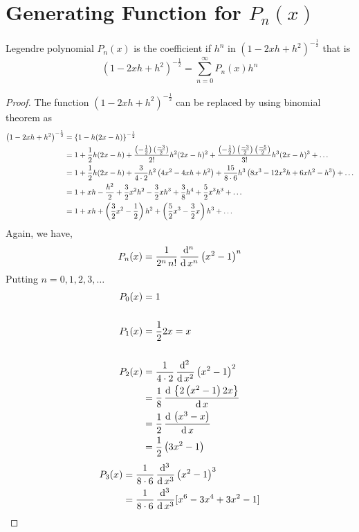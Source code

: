 \documentclass[../main-sheet.tex]{subfiles}
\begin{document}
\section{Generating Function for $ P_n(x) $}
Legendre polynomial $ P_n(x) $ is the coefficient if $ h^n $ in $ \left(1-2xh+h^2\right)^{-\frac{1}{2}} $ that is
\[
    \left(1-2xh+h^2\right)^{-\frac{1}{2}} =\sum_{n=0}^\infty P_n(x)h^n
\]
\begin{proof}
    The function $ \left(1-2xh+h^2\right)^{-\frac{1}{2}} $ can be replaced by using binomial theorem as 
    \begin{align}
        \left(1-2xh+h^2\right)^{-\frac{1}{2}} &=\left\{1-h(2x-h)\right\}^{-\frac{1}{2}}\notag\\
        &=1+\frac{1}{2}h(2x-h)+\frac{\left(-\frac{1}{2}\right)(\frac{-3}{2})}{2!}h^2(2x-h)^2+\frac{\left(-\frac{1}{2}\right)\left(\frac{-3}{2}\right)\left(\frac{-5}{2}\right)}{3!}h^3(2x-h)^3+\dots\notag\\
        &=1+\frac{1}{2}h(2x-h)+\frac{3}{4\cdot2}h^2\left(4x^2-4xh+h^2\right)+\frac{15}{8\cdot 6}h^3\left(8x^3-12x^2h+6xh^2-h^3\right)+\dots\notag\\
        &=1+xh-\frac{h^2}{2}+\frac{3}{2}x^2h^2-\frac{3}{2}xh^3+\frac{3}{8}h^4+\frac{5}{2}x^3h^3+\dots\notag\\
        &=1+xh+\left(\frac{3}{2}x^2-\frac{1}{2} \right)h^2+\left(\frac{5}{2}x^3-\frac{3}{2}x\right)h^3+\dots \label{eq:legendregen1}
    \end{align}
    Again, we have,
    \[
        P_n(x)=\frac{1}{2^n\,n!}\,\frac{\mathrm{d}^{n}\, }{\mathrm{d}\, x^{n}}\left(x^2-1\right)^n
    \]
    Putting $ n=0,1,2,3,\dots $
    \begin{align*}
        P_0(x)&=1\\
        &\\
        P_1(x)&=\frac{1}{2}2x=x\\
        &\\
        P_2(x)&=\frac{1}{4\cdot 2}\,\frac{\mathrm{d}^{2}\, }{\mathrm{d}\, x^{2}}\left(x^2-1\right)^2\\
        &=\frac{1}{8}\,\frac{\mathrm{d}\,\left\{2\left(x^2-1\right)2x\right\}}{\mathrm{d}\,x}\\
        &=\frac{1}{2}\,\frac{\mathrm{d}\,\left(x^3-x\right)}{\mathrm{d}\,x}\\
        &=\frac{1}{2}\left(3x^2-1\right)\\
    \end{align*}\begin{align*}
        P_3(x)&=\frac{1}{8\cdot 6}\ddxn{}{3}\left(x^2-1\right)^3\\
        &=\frac{1}{8\cdot 6}\ddxn{}{3}[x^6-3x^4+3x^2-1]\\

\end{align*}
\end{proof}
\end{document}

